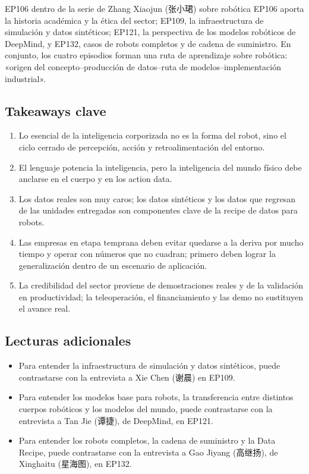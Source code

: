 \documentclass[a4paper]{article}
\begin{document}
\begin{importantbox}{EP106 dentro de la serie de Zhang Xiaojun (张小珺) sobre robótica}
EP106 aporta la historia académica y la ética del sector; EP109, la infraestructura de simulación y datos sintéticos; EP121, la perspectiva de los modelos robóticos de DeepMind, y EP132, casos de robots completos y de cadena de suministro. En conjunto, los cuatro episodios forman una ruta de aprendizaje sobre robótica: «origen del concepto--producción de datos--ruta de modelos--implementación industrial».
\end{importantbox}

\subsection{Takeaways clave}

\begin{enumerate}
\item Lo esencial de la inteligencia corporizada no es la forma del robot, sino el ciclo cerrado de percepción, acción y retroalimentación del entorno.
\item El lenguaje potencia la inteligencia, pero la inteligencia del mundo físico debe anclarse en el cuerpo y en los action data.
\item Los datos reales son muy caros; los datos sintéticos y los datos que regresan de las unidades entregadas son componentes clave de la recipe de datos para robots.
\item Las empresas en etapa temprana deben evitar quedarse a la deriva por mucho tiempo y operar con números que no cuadran; primero deben lograr la generalización dentro de un escenario de aplicación.
\item La credibilidad del sector proviene de demostraciones reales y de la validación en productividad; la teleoperación, el financiamiento y las demo no sustituyen el avance real.
\end{enumerate}

\subsection{Lecturas adicionales}

\begin{itemize}
\item Para entender la infraestructura de simulación y datos sintéticos, puede contrastarse con la entrevista a Xie Chen (谢晨) en EP109.
\item Para entender los modelos base para robots, la transferencia entre distintos cuerpos robóticos y los modelos del mundo, puede contrastarse con la entrevista a Tan Jie (谭捷), de DeepMind, en EP121.
\item Para entender los robots completos, la cadena de suministro y la Data Recipe, puede contrastarse con la entrevista a Gao Jiyang (高继扬), de Xinghaitu (星海图), en EP132.
\end{itemize}
\end{document}
